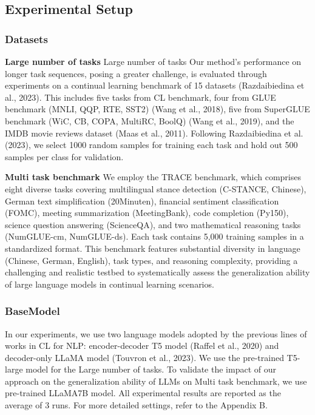 \documentclass[letterpaper]{article} %
\begin{document}
\subsection{Experimental Setup}
\subsubsection{Datasets}
\textbf{Large number of tasks}
Large number of tasks Our method’s performance on longer task sequences, posing a greater challenge, is evaluated through experiments on a continual learning benchmark of 15 datasets (Razdaibiedina et al., 2023). This includes five tasks from CL benchmark, four from GLUE benchmark (MNLI, QQP, RTE, SST2) (Wang et al., 2018), five from SuperGLUE benchmark (WiC, CB, COPA, MultiRC, BoolQ) (Wang et al., 2019), and the IMDB movie reviews dataset (Maas et al., 2011). Following Razdaibiedina et al. (2023), we select 1000 random samples for training each task and hold out 500 samples per class for validation.



\textbf{Multi task benchmark}
We employ the TRACE benchmark, which comprises eight diverse tasks covering multilingual stance detection (C-STANCE, Chinese), German text simplification (20Minuten), financial sentiment classification (FOMC), meeting summarization (MeetingBank), code completion (Py150), science question answering (ScienceQA), and two mathematical reasoning tasks (NumGLUE-cm, NumGLUE-ds). Each task contains 5,000 training samples in a standardized format. This benchmark features substantial diversity in language (Chinese, German, English), task types, and reasoning complexity, providing a challenging and realistic testbed to systematically assess the generalization ability of large language models in continual learning scenarios.

\subsubsection{BaseModel}
In our experiments, we use two language models adopted by the previous lines of works in CL for NLP: encoder-decoder T5 model (Raffel et al., 2020) and decoder-only LLaMA model (Touvron et al., 2023). We use the pre-trained T5-large model for the Large number of tasks. To validate the impact of our approach on the generalization ability of LLMs on Multi task benchmark, we use pre-trained LLaMA7B model. All experimental results are reported as the average of 3 runs. For more detailed settings, refer to the Appendix B.
\end{document}
